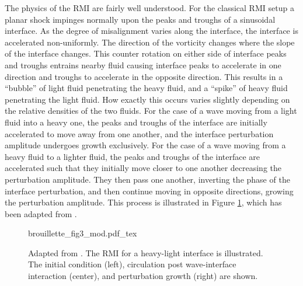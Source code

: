 The physics of the \ac{RMI} are fairly well understood. For the classical \ac{RMI}
setup a planar shock impinges normally upon the peaks and troughs of a
sinusoidal interface. As the degree of misalignment varies along the
interface, the interface is accelerated non-uniformly. The direction
of the vorticity changes where the slope of the interface
changes. This counter rotation on either side of interface peaks and
troughs entrains nearby fluid causing interface peaks to accelerate in
one direction and troughs to accelerate in the opposite
direction. This results in a ``bubble'' of light fluid penetrating the
heavy fluid, and a ``spike'' of heavy fluid penetrating the light
fluid. How exactly this occurs varies slightly depending on the
relative densities of the two fluids. For the case of a wave moving
from a light fluid into a heavy one, the peaks and troughs of the
interface are initially accelerated to move away from one another, and
the interface perturbation amplitude undergoes growth exclusively. For
the case of a wave moving from a heavy fluid to a lighter fluid, the
peaks and troughs of the interface are accelerated such that they
initially move closer to one another decreasing the perturbation
amplitude. They then pass one another, inverting the phase of the
interface perturbation, and then continue moving in opposite
directions, growing the perturbation amplitude. This process is
illustrated in Figure \ref{fig:rmi_schematic}, which has been adapted
from \cite{Brouillette2002}.
\begin{figure}
  \centering
  \def\svgwidth{0.9\textwidth}
  {brouillette_fig3_mod.pdf_tex} \hfill%
  \caption[A schematic view of the \ac{RMI} instability for a
  heavy-light interface]{Adapted from \cite{Brouillette2002}. The
    \ac{RMI} for a heavy-light interface is illustrated. The initial
    condition (left), circulation post wave-interface interaction
    (center), and perturbation growth (right) are shown.}
  \label{fig:rmi_schematic}
\end{figure}

